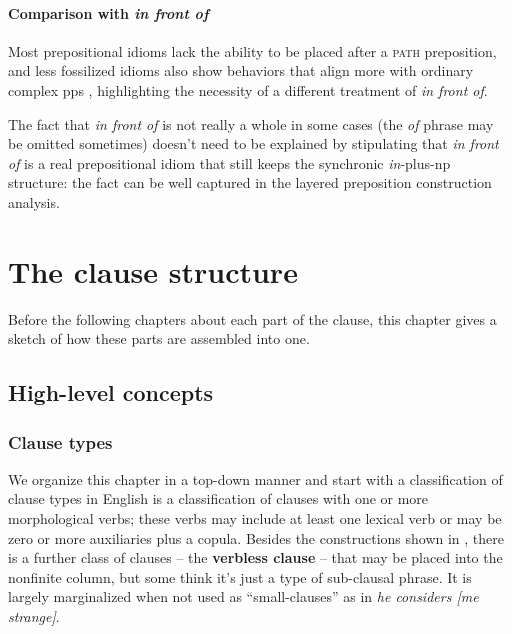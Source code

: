 \documentclass[UTF8, a4paper, oneside, scheme=plain, 12pt]{ctexbook}
\newcommand*{\citepage}[1]{p.~{#1}}
\newcommand*{\concept}[1]{\textbf{#1}}
\newcommand{\form}[1]{\emph{#1}}
\newcommand{\category}[1]{\textsc{#1}}
\begin{document}
\subsubsection{Comparison with \form{in front of}}\label{sec:np.pp.idiom.in-front-of}

Most prepositional idioms lack the ability 
to be placed after a \category{path} preposition,
and less fossilized idioms also show behaviors that align more with ordinary complex \acs{pp}s 
\citep[\citepage{620}]{cgel},
highlighting the necessity of a different treatment of \form{in front of}.

The fact that \form{in front of} is not really a whole in some cases 
(the \form{of} phrase may be omitted sometimes) 
doesn't need to be explained by stipulating that 
\form{in front of} is a real prepositional idiom that 
still keeps the synchronic \form{in}-plus-\acs{np} structure:
the fact can be well captured in the layered preposition construction analysis.

\chapter{The clause structure}\label{chap:simple-clause}

Before the following chapters about each part of the clause,
this chapter gives a sketch of how these parts are assembled into one.

\section{High-level concepts}

\subsection{Clause types}\label{sec:moods}

We organize this chapter in a top-down manner and 
start with a classification of clause types in English
 is a classification of clauses with one or more morphological verbs;
these verbs may include at least one lexical verb 
or may be zero or more auxiliaries plus a copula.
Besides the constructions shown in ,
there is a further class of clauses 
-- the \concept{verbless clause} \citep[\citepage{1266}]{cgel} -- 
that may be placed into the nonfinite column,
but some think it's just a type of sub-clausal phrase.
It is largely marginalized when not used as ``small-clauses'' 
as in \form{he considers [me strange]}.
\end{document}
